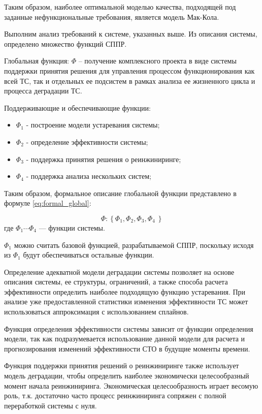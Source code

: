 Таким образом, наиболее оптимальной моделью качества, подходящей под заданные нефункциональные требования, является модель Мак-Кола.

Выполним анализ требований к системе, указанных выше. 
Из описания системы, определено множество функций СППР.

Глобальная функция: $\Phi$ – получение комплексного проекта в виде системы поддержки принятия решения для управления процессом функционирования как всей ТС, так и отдельных ее подсистем в рамках анализа ее жизненного цикла и процесса деградации ТС. 

Поддерживающие и обеспечивающие функции:
\begin{itemize}
    \item $\Phi_1$ - построение модели устаревания системы;
    \item $\Phi_2$ - определение эффективности системы;
    \item $\Phi_3$ - поддержка принятия решения о реинжиниринге;
    \item $\Phi_4$ - поддержка анализа нескольких систем;
\end{itemize}

Таким образом, формальное описание глобальной функции представлено в формуле \ref{eq:formal_global}:

\begin{equation}
    \label{eq:formal_global}
    \Phi: \left\{ \Phi_1, \Phi_2,\Phi_3,\Phi_4\ \right\}
\end{equation}
где $\Phi_1 \cdots \Phi_4 $ --- функции системы.

$\Phi_1$ можно считать базовой функцией, разрабатываемой СППР, поскольку исходя из $\Phi_1$ будут обеспечиваться остальные функции.

Определение адекватной модели деградации системы позволяет на основе описания системы, ее структуры, ограничений, а также способа расчета эффективности определить наиболее подходящую функцию устаревания. 
При анализе уже предоставленной статистики изменения эффективности ТС может использоваться аппроксимация с использованием сплайнов.

Функция определения эффективности системы зависит от функции определения модели, так как подразумевается использование данной модели для расчета и прогнозирования изменений эффективности СТО в будущие моменты времени.

Функция поддержки принятия решений о реинжиниринге также использует модель деградации, чтобы определить наиболее экономически целесообразный момент начала реинжиниринга. 
Экономическая целесообразность играет весомую роль, т.к. достаточно часто процесс реинжиниринга сопряжен с полной переработкой системы с нуля.

